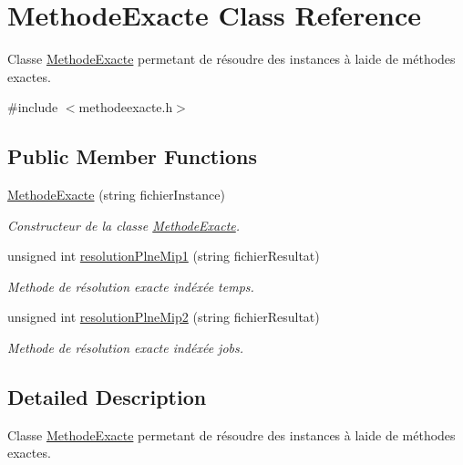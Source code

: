 \hypertarget{classMethodeExacte}{}\section{Methode\+Exacte Class Reference}
\label{classMethodeExacte}


Classe \hyperlink{classMethodeExacte}{Methode\+Exacte} permetant de résoudre des instances à l\textquotesingle{}aide de méthodes exactes.  




{\ttfamily \#include $<$methodeexacte.\+h$>$}

\subsection*{Public Member Functions}
\begin{DoxyCompactItemize}
\item 
\hyperlink{classMethodeExacte_a1548457daee37a44a3913378d90dab65}{Methode\+Exacte} (string fichier\+Instance)
\begin{DoxyCompactList}\small\item\em Constructeur de la classe \hyperlink{classMethodeExacte}{Methode\+Exacte}. \end{DoxyCompactList}\item 
unsigned int \hyperlink{classMethodeExacte_a91443b3ea749912772b40b5b5c40379e}{resolution\+Plne\+Mip1} (string fichier\+Resultat)
\begin{DoxyCompactList}\small\item\em Methode de résolution exacte indéxée temps. \end{DoxyCompactList}\item 
unsigned int \hyperlink{classMethodeExacte_a3163e487cc9e99ee7667d1dd146edb4b}{resolution\+Plne\+Mip2} (string fichier\+Resultat)
\begin{DoxyCompactList}\small\item\em Methode de résolution exacte indéxée jobs. \end{DoxyCompactList}\end{DoxyCompactItemize}


\subsection{Detailed Description}
Classe \hyperlink{classMethodeExacte}{Methode\+Exacte} permetant de résoudre des instances à l\textquotesingle{}aide de méthodes exactes. 

